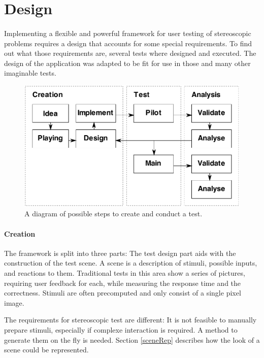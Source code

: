 \section{Design\label{Design}}
\paragraph{}
Implementing a flexible and powerful framework for user testing of stereoscopic problems requires a design that accounts for some special requirements. To find out what those requirements are, several tests where designed and executed. The design of the application was adapted to be fit for use in those and many other imaginable tests.

\begin{figure}[htb]
\begin{center}
\includegraphics[width=15.5cm]{media/workflow.pdf}
\caption{A diagram of possible steps to create and conduct a test.\label{imgWorkflow}}
\end{center}
\end{figure}

\paragraph{Creation}
The framework is split into three parts: The test design part aids with the construction of the test scene. A scene is a description of stimuli, possible inputs, and reactions to them. Traditional tests in this area show a series of pictures, requiring user feedback for each, while measuring the response time and the correctness. Stimuli are often precomputed and only consist of a single pixel image.

The requirements for stereoscopic test are different: It is not feasible to manually prepare stimuli, especially if complexe interaction is required. A method to generate them on the fly is needed.
Section \ref{sceneRep} describes how the look of a scene could be represented.


